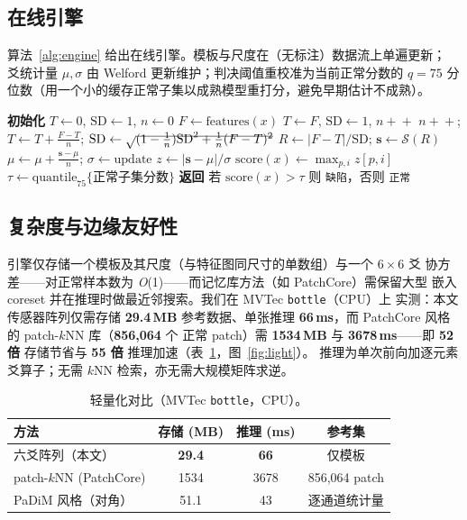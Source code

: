 \documentclass[journal,10pt]{IEEEtran}
\begin{document}
\subsection{在线引擎}
算法~\ref{alg:engine} 给出在线引擎。模板与尺度在（无标注）数据流上单遍更新；
爻统计量 $\mu,\sigma$ 由 Welford 更新维护；判决阈值重校准为当前正常分数的
$q{=}75$ 分位数（用一个小的缓存正常子集以成熟模型重打分，避免早期估计不成熟）。

\begin{algorithm}[t]
\caption{在线六爻异常引擎}
\label{alg:engine}
\begin{algorithmic}[1]
\State \textbf{初始化} $T\!\leftarrow\!0$, $\mathrm{SD}\!\leftarrow\!1$,
       $n\!\leftarrow\!0$
    \State $F\leftarrow\mathrm{features}(x)$
     $T\leftarrow F$, $\mathrm{SD}\leftarrow 1$, $n\!+\!+$
    \Else
        \State $n\!+\!+$;
               $T\leftarrow T+\frac{F-T}{n}$;
               $\mathrm{SD}\leftarrow\sqrt{\smash{(1-\tfrac1n)\mathrm{SD}^2+\tfrac1n(F-T)^2}}$
    \EndIf
    \State $R\leftarrow|F-T|/\mathrm{SD}$;
           $\mathbf{s}\leftarrow\mathcal{S}(R)$
    \State $\mu\leftarrow\mu+\frac{\mathbf{s}-\mu}{n}$;
           $\sigma\leftarrow\mathrm{update}$ 
    \State $z\leftarrow|\mathbf{s}-\mu|/\sigma$
    \State $\mathrm{score}(x)\leftarrow\max_{p,i} z[p,i]$
    \State $\tau\leftarrow\mathrm{quantile}_{75}\{\text{正常子集分数}\}$
    \State \textbf{返回} 若 $\mathrm{score}(x)>\tau$ 则 \texttt{缺陷}，否则 \texttt{正常}
\EndFor
\end{algorithmic}
\end{algorithm}

\subsection{复杂度与边缘友好性}
引擎仅存储一个模板及其尺度（与特征图同尺寸的单数组）与一个 $6{\times}6$ 爻
协方差——对正常样本数为 \emph{O}(1)——而记忆库方法（如 PatchCore）需保留大型
嵌入 coreset 并在推理时做最近邻搜索。我们在 MVTec \texttt{bottle}（CPU）上
实测：本文传感器阵列仅需存储 \textbf{29.4\,MB} 参考数据、单张推理
\textbf{66\,ms}，而 PatchCore 风格的 patch-$k$NN 库（\textbf{856{,}064} 个
正常 patch）需 \textbf{1534\,MB} 与 \textbf{3678\,ms}——即 \textbf{52 倍}
存储节省与 \textbf{55 倍} 推理加速（表~\ref{tab:cost}，图~\ref{fig:light}）。
推理为单次前向加逐元素爻算子；无需 $k$NN 检索，亦无需大规模矩阵求逆。

\begin{table}[t]
\centering
\caption{轻量化对比（MVTec \texttt{bottle}，CPU）。}
\label{tab:cost}
\begin{tabular}{lccc}
\toprule
方法 & 存储 (MB) & 推理 (ms) & 参考集 \\
\midrule
六爻阵列（本文） & \textbf{29.4} & \textbf{66} & 仅模板 \\
patch-$k$NN (PatchCore) & 1534 & 3678 & 856{,}064 patch \\
PaDiM 风格（对角） & 51.1 & 43 & 逐通道统计量 \\
\bottomrule
\end{tabular}
\end{table}
\end{document}
